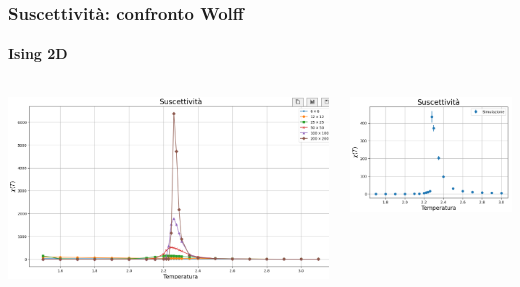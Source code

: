 \begin{frame}
    \frametitle{Suscettività: confronto Wolff}
    \framesubtitle{Ising 2D}

    \begin{columns}
        \begin{column}{0.5\textwidth}

            \centering
            \includegraphics[width=\textwidth]{Immagini/backupIsing2D/chi_w.png}

        \end{column}
    
        \begin{column}{0.5\textwidth}

            \centering
            \includegraphics[width=\textwidth]{Immagini/backupIsing2D/chi_w1.png}
            
        \end{column}
    \end{columns}

\end{frame}